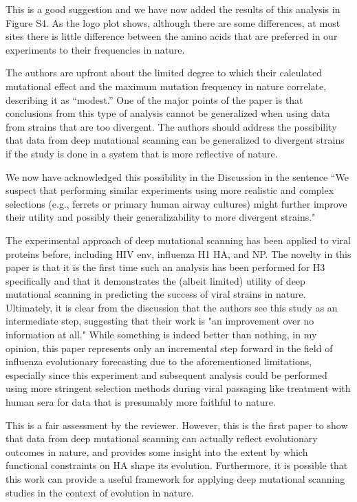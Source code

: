 \documentclass[11pt, oneside]{article}   	%
\newcommand{\response}[1]{{\color{black}#1}}
\begin{document}
\response{This is a good suggestion and we have now added the results of this analysis in Figure S4.
As the logo plot shows, although there are some differences, at most sites there is little difference between the amino acids that are preferred in our experiments to their frequencies in nature.
}

The authors are upfront about the limited degree to which their calculated mutational effect and the maximum mutation frequency in nature correlate, describing it as ``modest.'' One of the major points of the paper is that conclusions from this type of analysis cannot be generalized when using data from strains that are too divergent. The authors should address the possibility that data from deep mutational scanning can be generalized to divergent strains if the study is done in a system that is more reflective of nature. 

\response{We now have acknowledged this possibility in the Discussion in the sentence ``We suspect that performing similar experiments using more realistic and complex selections (e.g., ferrets or primary human airway cultures) might further improve their utility and possibly their generalizability to more divergent strains."}

The experimental approach of deep mutational scanning has been applied to viral proteins before, including HIV env, influenza H1 HA, and NP. The novelty in this paper is that it is the first time such an analysis has been performed for H3 specifically and that it demonstrates the (albeit limited) utility of deep mutational scanning in predicting the success of viral strains in nature. Ultimately, it is clear from the discussion that the authors see this study as an intermediate step, suggesting that their work is "an improvement over no information at all." While something is indeed better than nothing, in my opinion, this paper represents only an incremental step forward in the field of influenza evolutionary forecasting due to the aforementioned limitations, especially since this experiment and subsequent analysis could be performed using more stringent selection methods during viral passaging like treatment with human sera for data that is presumably more faithful to nature. 

\response{This is a fair assessment by the reviewer.
However, this is the first paper to show that data from deep mutational scanning can actually reflect evolutionary outcomes in nature, and provides some insight into the extent by which functional constraints on HA shape its evolution. 
Furthermore, it is possible that this work can provide a useful framework for applying deep mutational scanning studies in the context of evolution in nature.
}
\end{document}
